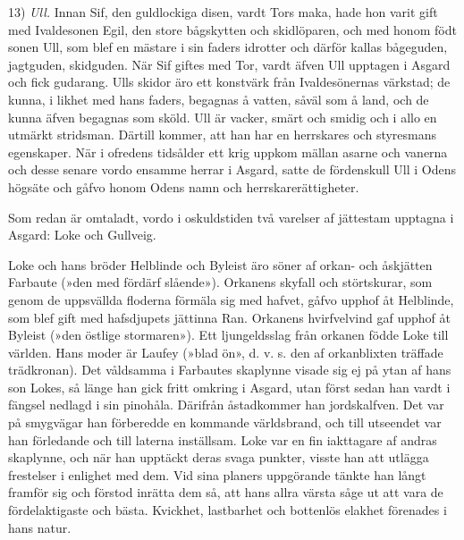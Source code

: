 13) \emph{Ull.} Innan Sif, den guldlockiga disen, vardt Tors maka, hade
hon varit gift med Ivaldesonen Egil, den store bågskytten och
skidlöparen, och med honom födt sonen Ull, som blef en mästare i sin
faders idrotter och därför kallas bågeguden, jagtguden, skidguden. När
Sif giftes med Tor, vardt äfven Ull upptagen i Asgard och fick gudarang.
Ulls skidor äro ett konstvärk från Ivaldesönernas värkstad; de
\protect\hypertarget{lb1625905.xhtmlux5cux23start33}{}{}\protect\hypertarget{lb1625905.xhtmlux5cux23start33-a}{}{}\protect\hypertarget{lb1625905.xhtmlux5cux23start33-b}{}{}\protect\hypertarget{lb1625905.xhtmlux5cux23start33-c}{}{}\protect\hypertarget{lb1625905.xhtmlux5cux23start33-d}{}{}
kunna, i likhet med hans faders, begagnas å vatten, såväl som å land,
och de kunna äfven begagnas som sköld. Ull är vacker, smärt och smidig
och i allo en utmärkt stridsman. Därtill kommer, att han har en
herrskares och styresmans egenskaper. När i ofredens tidsålder ett krig
uppkom mällan asarne och vanerna och desse senare vordo ensamme herrar i
Asgard, satte de fördenskull Ull i Odens högsäte och gåfvo honom Odens
namn och herrskarerättigheter.

Som redan är omtaladt, vordo i oskuldstiden två varelser af jättestam
upptagna i Asgard: Loke och Gullveig.

Loke och hans bröder Helblinde och Byleist äro söner af orkan- och
åskjätten Farbaute (»den med fördärf slående»). Orkanens skyfall och
störtskurar, som genom de uppsvällda floderna förmäla sig med hafvet,
gåfvo upphof åt Helblinde, som blef gift med hafsdjupets jättinna Ran.
Orkanens hvirfvelvind gaf upphof åt Byleist (»den östlige stormaren»).
Ett ljungeldsslag från orkanen födde Loke till världen. Hans moder är
Laufey (»blad ön», d. v. s. den af orkanblixten träffade trädkronan).
Det våldsamma i Farbautes skaplynne visade sig ej på ytan af hans son
Lokes, så länge han gick fritt omkring i Asgard, utan först sedan han
vardt i fängsel nedlagd i sin pinohåla. Därifrån åstadkommer han
jordskalfven. Det var på smygvägar han förberedde en kommande
världsbrand, och till utseendet var han förledande och till laterna
inställsam. Loke var en fin iakttagare af andras skaplynne, och när han
upptäckt deras svaga punkter, visste han att utlägga frestelser i
enlighet med dem. Vid sina planers uppgörande tänkte han långt framför
sig och förstod inrätta dem så, att hans allra värsta såge ut att vara
de fördelaktigaste och bästa. Kvickhet, lastbarhet och bottenlös elakhet
förenades i hans natur.

